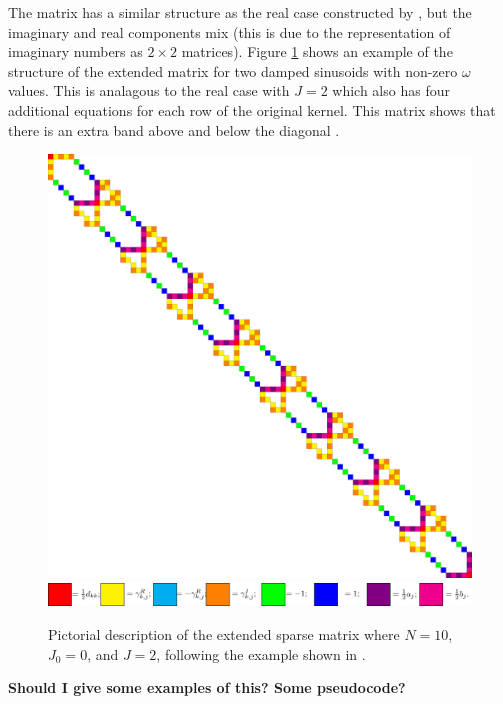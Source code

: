 \documentclass[manuscript, letterpaper]{aastex6}
\newcommand{\figurelabel}[1]{\label{fig:#1}}
\begin{document}
The matrix has a similar structure as the real case constructed by \citep{Ambikasaran:2015}, but the
imaginary and real components mix (this is due to the representation of imaginary numbers as
$2\times 2$ matrices).  Figure \ref{fig:matrix_structure} shows an example of the structure of the extended
matrix for two damped sinusoids with non-zero $\omega$ values.  This is analagous to the real case with
$J=2$ which also has four additional equations for each row of the original kernel.  This matrix shows
that there is an extra band above and below the diagonal \citep[compare with Figure 2 of][]{Ambikasaran:2015}.

\begin{figure}[!htbp]
\begin{center}
\includegraphics[scale=0.175]{figures/twoterm.pdf}
\hspace{0.2in}
\includegraphics[scale=0.85]{figures/colorcode.pdf}
\end{center}
\caption{Pictorial description of the extended sparse matrix where $N=10$, $J_0=0$, and $J=2$, following
the example shown in \citet{Ambikasaran:2015}.}
\figurelabel{matrix_structure}
\end{figure}

{\bf Should I give some examples of this?  Some pseudocode?}


\end{document}
